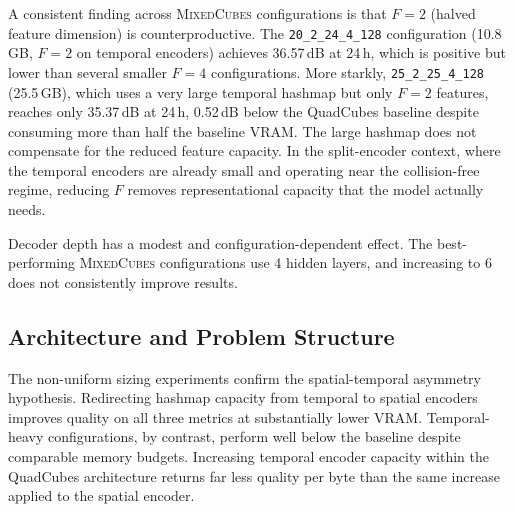 \documentclass[12pt, a4paper, twoside]{report}
\newcommand{\MixedCubes}{\textsc{MixedCubes}}
\begin{document}
A consistent finding across \MixedCubes{} configurations is that $F=2$ (halved feature dimension) is counterproductive. The \texttt{20\_2\_24\_4\_128} configuration (10.8\,GB, $F=2$ on temporal encoders) achieves 36.57\,dB at 24\,h, which is positive but lower than several smaller $F=4$ configurations. More starkly, \texttt{25\_2\_25\_4\_128} (25.5\,GB), which uses a very large temporal hashmap but only $F=2$ features, reaches only 35.37\,dB at 24\,h, 0.52\,dB below the QuadCubes baseline despite consuming more than half the baseline VRAM. The large hashmap does not compensate for the reduced feature capacity. In the split-encoder context, where the temporal encoders are already small and operating near the collision-free regime, reducing $F$ removes representational capacity that the model actually needs.

Decoder depth has a modest and configuration-dependent effect. The best-performing \MixedCubes{} configurations use 4 hidden layers, and increasing to 6 does not consistently improve results.

\subsection{Architecture and Problem Structure}
\label{subsec:asymmetry_synthesis}

The non-uniform sizing experiments confirm the spatial-temporal asymmetry hypothesis. Redirecting hashmap capacity from temporal to spatial encoders improves quality on all three metrics at substantially lower VRAM. Temporal-heavy configurations, by contrast, perform well below the baseline despite comparable memory budgets. Increasing temporal encoder capacity within the QuadCubes architecture returns far less quality per byte than the same increase applied to the spatial encoder.
\end{document}
